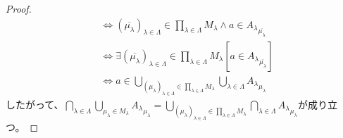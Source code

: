 \documentclass[a4paper]{jsarticle}
\begin{document}
\begin{proof}
\begin{align*}
&\Leftrightarrow \left( \overline{\mu_{\lambda}} \right)_{\lambda \in \varLambda} \in \prod_{\lambda \in \varLambda} M_{\lambda} \land a \in {A_{\lambda}}_{\overline{\mu_{\lambda}}}\\
&\Leftrightarrow \exists\left( \overline{\mu_{\lambda}} \right)_{\lambda \in \varLambda} \in \prod_{\lambda \in \varLambda} M_{\lambda}\left[ a \in {A_{\lambda}}_{\overline{\mu_{\lambda}}} \right]\\
&\Leftrightarrow a \in \bigcup_{\left( \mu_{\lambda} \right)_{\lambda \in \varLambda} \in \prod_{\lambda \in \varLambda} M_{\lambda}} {\bigcup_{\lambda \in \varLambda} {A_{\lambda}}_{\mu_{\lambda}}}
\end{align*}
したがって、$\bigcap_{\lambda \in \varLambda} {\bigcup_{\mu_{\lambda} \in M_{\lambda}} {A_{\lambda}}_{\mu_{\lambda}}} = \bigcup_{\left( \mu_{\lambda} \right)_{\lambda \in \varLambda} \in \prod_{\lambda \in \varLambda} M_{\lambda}} {\bigcap_{\lambda \in \varLambda} {A_{\lambda}}_{\mu_{\lambda}}}$が成り立つ。
\end{proof}
\end{document}
